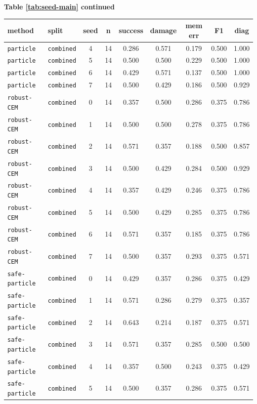 \documentclass{article}
\begin{document}
\begin{center}
\textbf{Table \ref{tab:seed-main} continued}\\[0.4ex]
\begin{tabular}{llccccccc}
\toprule
method & split & seed & n & success & damage & mem err & F1 & diag \\
\midrule
\texttt{particle} & \texttt{combined} & 4 & 14 & 0.286 & 0.571 & 0.179 & 0.500 & 1.000 \\
\texttt{particle} & \texttt{combined} & 5 & 14 & 0.500 & 0.500 & 0.229 & 0.500 & 1.000 \\
\texttt{particle} & \texttt{combined} & 6 & 14 & 0.429 & 0.571 & 0.137 & 0.500 & 1.000 \\
\texttt{particle} & \texttt{combined} & 7 & 14 & 0.500 & 0.429 & 0.186 & 0.500 & 0.929 \\
\texttt{robust-CEM} & \texttt{combined} & 0 & 14 & 0.357 & 0.500 & 0.286 & 0.375 & 0.786 \\
\texttt{robust-CEM} & \texttt{combined} & 1 & 14 & 0.500 & 0.500 & 0.278 & 0.375 & 0.786 \\
\texttt{robust-CEM} & \texttt{combined} & 2 & 14 & 0.571 & 0.357 & 0.188 & 0.500 & 0.857 \\
\texttt{robust-CEM} & \texttt{combined} & 3 & 14 & 0.500 & 0.429 & 0.284 & 0.500 & 0.929 \\
\texttt{robust-CEM} & \texttt{combined} & 4 & 14 & 0.357 & 0.429 & 0.246 & 0.375 & 0.786 \\
\texttt{robust-CEM} & \texttt{combined} & 5 & 14 & 0.500 & 0.429 & 0.285 & 0.375 & 0.786 \\
\texttt{robust-CEM} & \texttt{combined} & 6 & 14 & 0.571 & 0.357 & 0.185 & 0.375 & 0.786 \\
\texttt{robust-CEM} & \texttt{combined} & 7 & 14 & 0.500 & 0.357 & 0.293 & 0.375 & 0.571 \\
\texttt{safe-particle} & \texttt{combined} & 0 & 14 & 0.429 & 0.357 & 0.286 & 0.375 & 0.429 \\
\texttt{safe-particle} & \texttt{combined} & 1 & 14 & 0.571 & 0.286 & 0.279 & 0.375 & 0.357 \\
\texttt{safe-particle} & \texttt{combined} & 2 & 14 & 0.643 & 0.214 & 0.187 & 0.375 & 0.571 \\
\texttt{safe-particle} & \texttt{combined} & 3 & 14 & 0.571 & 0.357 & 0.285 & 0.500 & 0.500 \\
\texttt{safe-particle} & \texttt{combined} & 4 & 14 & 0.357 & 0.500 & 0.243 & 0.375 & 0.429 \\
\texttt{safe-particle} & \texttt{combined} & 5 & 14 & 0.500 & 0.357 & 0.286 & 0.375 & 0.571 \\

\end{tabular}
\end{center}
\end{document}
